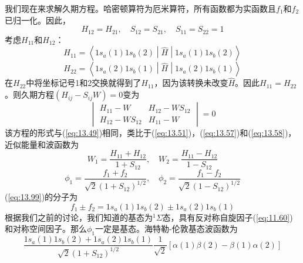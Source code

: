     我们现在来求解久期方程。哈密顿算符为厄米算符，所有函数都为实函数且$f_1$和$f_2$已归一化。因此，
    \begin{equation*}
        H_{12} = H_{21}, \quad S_{12} = S_{21}, \quad S_{11} = S_{22} = 1
    \end{equation*}
    考虑$H_{11}$和$H_{12}$：
    \begin{equation*}
        H_{11} = \left\langle 1s_a\left(1\right)1s_b\left(2\right) \middle| \hat{H} \middle| 1s_a\left(1\right)1s_b\left(2\right) \right\rangle
    \end{equation*}
    \begin{equation*}
        H_{22} = \left\langle 1s_a\left(2\right)1s_b\left(1\right) \middle| \hat{H} \middle| 1s_a\left(2\right)1s_b\left(1\right) \right\rangle
    \end{equation*}
    在$H_{22}$中将坐标记号1和2交换就得到了$H_{11}$，因为该转换未改变$\hat{H}$。因此$H_{11} = H_{22}$。则久期方程$\left(H_{ij} - S_{ij}W\right) = 0$变为
    \begin{equation}
        \begin{vmatrix}
            H_{11} - W & H_{12} - WS_{12} \\
            H_{12} - WS_{12} & H_{11} - W
        \end{vmatrix} = 0
        \label{eq:13.97}
    \end{equation}
    该方程的形式与(\ref{eq:13.49})相同，类比于(\ref{eq:13.51})，(\ref{eq:13.57})和(\ref{eq:13.58})，近似能量和波函数为
    \begin{equation}
        W_1 = \frac{H_{11} + H_{12}}{1 + S_{12}}, \quad W_2 = \frac{H_{11} - H_{12}}{1 - S_{12}}
        \label{eq:13.98}
    \end{equation}
    \begin{equation}
        \phi_1 = \frac{f_1 + f_2}{\sqrt{2} \left(1 + S_{12}\right)^{1/2}}, \quad \phi_2 = \frac{f_1 - f_2}{\sqrt{2} \left(1 - S_{12}\right)^{1/2}}
        \label{eq:13.99}
    \end{equation}
    (\ref{eq:13.99})的分子为
    \begin{equation*}
        f_1 \pm f_2 = 1s_a\left(1\right)1s_b\left(2\right) \pm 1s_a\left(2\right)1s_b\left(1\right)
    \end{equation*}
    根据我们之前的讨论，我们知道的基态为$^1\Sigma$态，具有反对称自旋因子(\ref{eq:11.60})和对称空间因子。那么$\phi_1$一定是基态。海特勒-伦敦基态波函数为
    \begin{equation}
        \frac{
            1s_a\left(1\right)1s_b\left(2\right) + 1s_a\left(2\right)1s_b\left(1\right)
        }{  
            \sqrt{2}\left(1 + S_{12}\right)^{1/2}}\frac{1}{\sqrt{2}
        }
        \left[\alpha\left(1\right)\beta\left(2\right) - \beta\left(1\right)\alpha\left(2\right)\right]
        \label{eq:13.100}
    \end{equation}
